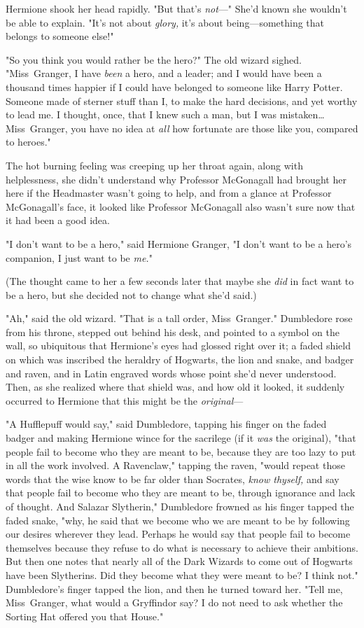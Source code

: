 Hermione shook her head rapidly. "But that's \emph{not}---" She'd known she
wouldn't be able to explain. "It's not about \emph{glory,} it's about
being---something that belongs to someone else!"

"So you think you would rather be the hero?" The old wizard sighed.
"Miss~Granger, I have \emph{been} a hero, and a leader; and I would have been a
thousand times happier if I could have belonged to someone like Harry Potter.
Someone made of sterner stuff than I, to make the hard decisions, and yet
worthy to lead me. I thought, once, that I knew such a man, but I was
mistaken…Miss~Granger, you have no idea at \emph{all} how fortunate are
those like you, compared to heroes."

The hot burning feeling was creeping up her throat again, along with
helplessness, she didn't understand why Professor McGonagall had brought her
here if the Headmaster wasn't going to help, and from a glance at Professor
McGonagall's face, it looked like Professor McGonagall also wasn't sure now
that it had been a good idea.

"I don't want to be a hero," said Hermione Granger, "I don't want to be a
hero's companion, I just want to be \emph{me.}"

(The thought came to her a few seconds later that maybe she \emph{did} in fact
want to be a hero, but she decided not to change what she'd said.)

"Ah," said the old wizard. "That is a tall order, Miss~Granger." Dumbledore
rose from his throne, stepped out behind his desk, and pointed to a symbol on
the wall, so ubiquitous that Hermione's eyes had glossed right over it; a faded
shield on which was inscribed the heraldry of Hogwarts, the lion and snake, and
badger and raven, and in Latin engraved words whose point she'd never
understood. Then, as she realized where that shield was, and how old it looked,
it suddenly occurred to Hermione that this might be the \emph{original}---

"A Hufflepuff would say," said Dumbledore, tapping his finger on the faded
badger and making Hermione wince for the sacrilege (if it \emph{was} the
original), "that people fail to become who they are meant to be, because they
are too lazy to put in all the work involved. A Ravenclaw," tapping the raven,
"would repeat those words that the wise know to be far older than Socrates,
\emph{know thyself,} and say that people fail to become who they are meant to
be, through ignorance and lack of thought. And Salazar Slytherin," Dumbledore
frowned as his finger tapped the faded snake, "why, he said that we become who
we are meant to be by following our desires wherever they lead. Perhaps he
would say that people fail to become themselves because they refuse to do what
is necessary to achieve their ambitions. But then one notes that nearly all of
the Dark Wizards to come out of Hogwarts have been Slytherins. Did they become
what they were meant to be? I think not." Dumbledore's finger tapped the lion,
and then he turned toward her. "Tell me, Miss~Granger, what would a Gryffindor
say? I do not need to ask whether the Sorting Hat offered you that House."

